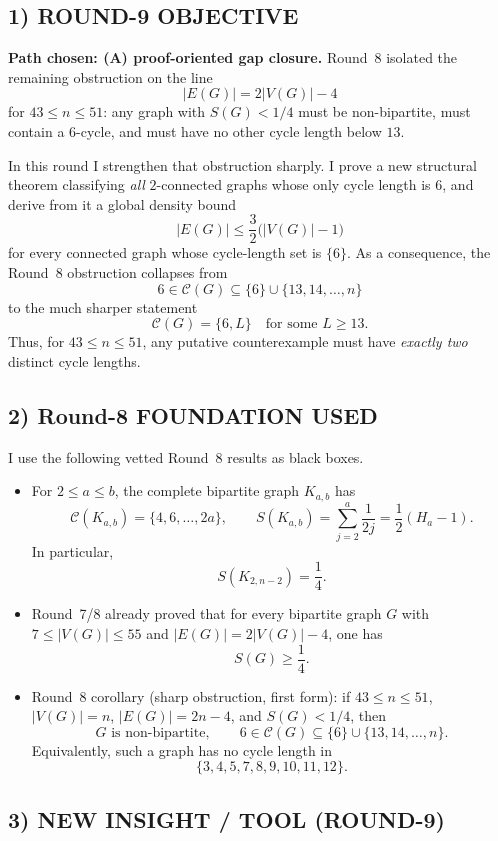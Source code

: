 \subsection*{1) ROUND-9 OBJECTIVE}

\textbf{Path chosen: (A) proof-oriented gap closure.}
Round~8 isolated the remaining obstruction on the line
\[
|E(G)|=2|V(G)|-4
\]
for $43\le n\le 51$: any graph with $S(G)<1/4$ must be non-bipartite, must contain a $6$-cycle, and must have no other cycle length below $13$.

In this round I strengthen that obstruction sharply. I prove a new structural theorem classifying \emph{all} $2$-connected graphs whose only cycle length is $6$, and derive from it a global density bound
\[
|E(G)|\le \frac32\bigl(|V(G)|-1\bigr)
\]
for every connected graph whose cycle-length set is $\{6\}$.
As a consequence, the Round~8 obstruction collapses from
\[
6\in \mathcal C(G)\subseteq \{6\}\cup\{13,14,\dots,n\}
\]
to the much sharper statement
\[
\mathcal C(G)=\{6,L\}\quad\text{for some }L\ge 13.
\]
Thus, for $43\le n\le 51$, any putative counterexample must have \emph{exactly two} distinct cycle lengths.

\subsection*{2) Round-8 FOUNDATION USED}

I use the following vetted Round~8 results as black boxes.

\begin{itemize}
\item[(F1)] For $2\le a\le b$, the complete bipartite graph $K_{a,b}$ has
\[
\mathcal C(K_{a,b})=\{4,6,\dots,2a\},
\qquad
S(K_{a,b})=\sum_{j=2}^{a}\frac1{2j}=\frac12(H_a-1).
\]
In particular,
\[
S(K_{2,n-2})=\frac14.
\]

\item[(F2)] Round~7/8 already proved that for every bipartite graph $G$ with $7\le |V(G)|\le 55$ and $|E(G)|=2|V(G)|-4$, one has
\[
S(G)\ge \frac14.
\]

\item[(F3)] Round~8 corollary (sharp obstruction, first form): if $43\le n\le 51$, $|V(G)|=n$, $|E(G)|=2n-4$, and $S(G)<1/4$, then
\[
G\text{ is non-bipartite},
\qquad
6\in \mathcal C(G)\subseteq \{6\}\cup\{13,14,\dots,n\}.
\]
Equivalently, such a graph has no cycle length in
\[
\{3,4,5,7,8,9,10,11,12\}.
\]
\end{itemize}

\subsection*{3) NEW INSIGHT / TOOL (ROUND-9)}

